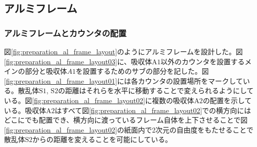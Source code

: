 \documentclass[../../main.tex]{subfiles}
\numberwithin{equation}{section}
\numberwithin{table}{section}
\numberwithin{figure}{section}
\begin{document}
  \subsection{アルミフレーム}\label{sec:aluminium-fram_append}


  \subsubsection{アルミフレームとカウンタの配置}
    図\ref{fig:preparation_al_frame_layout}のようにアルミフレームを設計した。図\ref{fig:preparation_al_frame_layout03}に、吸収体$\text{A1}$以外のカウンタを設置するメインの部分と吸収体$A1$を設置するためのサブの部分を記した。図\ref{fig:preparation_al_frame_layout01}には各カウンタの設置場所をマークしている。散乱体$\mathrm{S1}$, $\mathrm{S2}$の距離はそれらを水平に移動することで変えられるようにしている。図\ref{fig:preparation_al_frame_layout02}に複数の吸収体$\text{A2}$の配置を示している。吸収体$\mathrm{A2}$はすべて図\ref{fig:preparation_al_frame_layout02}での横方向にはどこにでも配置でき、横方向に渡っているフレーム自体を上下させることで図\ref{fig:preparation_al_frame_layout02}の紙面内で2次元の自由度をもたせることで散乱体$\mathrm{S2}$からの距離を変えることを可能にしている。
  
\end{document}
